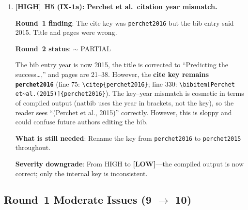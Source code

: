 \documentclass[12pt,a4paper]{article}
\newcommand{\HIGH}{\textbf{\textcolor{errorred}{[HIGH]}}}
\newcommand{\MED}{\textbf{\textcolor{warncolor}{[MED]}}}
\newcommand{\LOW}{\textbf{\textcolor{okgreen}{[LOW]}}}
\newcommand{\PARTIAL}{\textcolor{warncolor}{$\sim$ PARTIAL}}
\begin{document}
\begin{enumerate}
\textbf{What is still needed}: Add to Section~2 or as a footnote to Table~1: ``The VT Sharpe ratio is $\bar{r}^{\text{VT}} / \sigma^{\text{VT}}$ where $r^{\text{VT}}_t = w^{\text{VT}}_t \cdot r_t$. The risk-free rate is zero in the simulation. Weights can exceed 1.0 (up to the 1.5 cap), implying leverage. At high $\phi$, VT agents' own trading substantially influences $r_t$, making the Sharpe ratio endogenous to the adoption level.''

\textbf{Severity downgrade}: From HIGH to \MED---this is an exposition gap, not a methodological error.

\medskip

\item \HIGH\ \textbf{H5 (IX-1a): Perchet et al.\ citation year mismatch.}

\textbf{Round~1 finding}: The cite key was \texttt{perchet2016} but the bib entry said 2015. Title and pages were wrong.

\textbf{Round~2 status}: \PARTIAL

The bib entry year is now 2015, the title is corrected to ``Predicting the success\ldots,'' and pages are 21--38. However, the \textbf{cite key remains \texttt{perchet2016}} (line 75: \texttt{\textbackslash citep\{perchet2016\}}; line 330: \texttt{\textbackslash bibitem[Perchet et\~{}al.(2015)]\{perchet2016\}}). The key--year mismatch is cosmetic in terms of compiled output (natbib uses the year in brackets, not the key), so the reader sees ``(Perchet et al., 2015)'' correctly. However, this is sloppy and could confuse future authors editing the bib.

\textbf{What is still needed}: Rename the key from \texttt{perchet2016} to \texttt{perchet2015} throughout.

\textbf{Severity downgrade}: From HIGH to \LOW---the compiled output is now correct; only the internal key is inconsistent.

\end{enumerate}

\medskip

\subsection*{\textcolor{warncolor}{Round~1 Moderate Issues (9 $\to$ 10)}}
\end{document}
